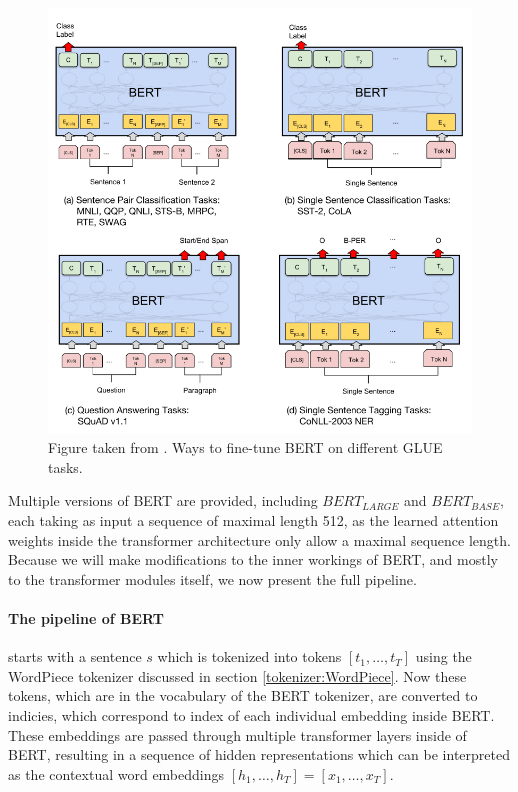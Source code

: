 \documentclass[a4paper,12pt,oneside,openright]{report}
\begin{document}
\begin{figure}[h]
	\center
  \includegraphics[width=0.8\linewidth]{./assets/background/BERT_GLUE_finetune.png}
  \caption{Figure taken from \cite{devlin18}. Ways to fine-tune BERT on different GLUE tasks.}
  \label{fig:cbow_skipgram}
\end{figure}

Multiple versions of BERT are provided, including $BERT_{LARGE}$ and $BERT_{BASE}$, each taking as input a sequence of maximal length 512, as the learned attention weights inside the transformer architecture only allow a maximal sequence length. 
Because we will make modifications to the inner workings of BERT, and mostly to the transformer modules itself, we now present the full pipeline. 

\paragraph{The pipeline of BERT} starts with a sentence $s$ which is tokenized into tokens $[t_1, \ldots, t_T]$ using the WordPiece tokenizer discussed in section \ref{tokenizer:WordPiece}.
Now these tokens, which are in the vocabulary of the BERT tokenizer, are converted to indicies, which correspond to index of each individual embedding inside BERT.
These embeddings are passed through multiple transformer layers inside of BERT, resulting in a sequence of hidden representations which can be interpreted as the contextual word embeddings $[h_1, \ldots, h_T] = [x_1, \ldots, x_T]$.
\end{document}
